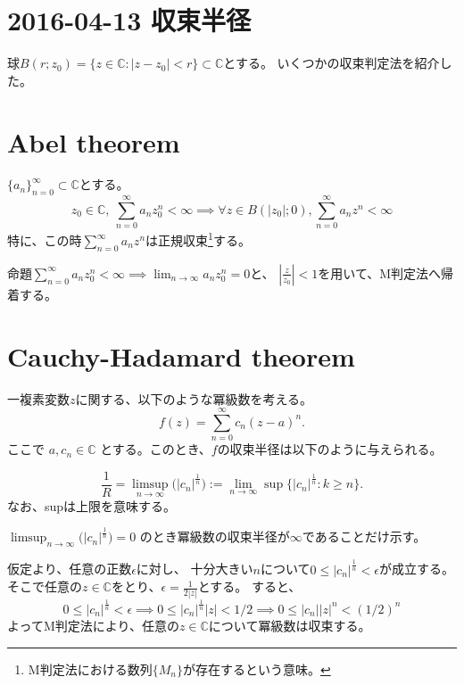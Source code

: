 \documentclass[a4paper]{jarticle}
\begin{document}
\section{2016-04-13 収束半径}
    球$B(r;z_0)=\{ z \in \mathbb{C} : |z-z_0|<r \} \subset \mathbb{C}$とする。
    いくつかの収束判定法を紹介した。

    \section{Abel theorem}
        \begin{Them}
            $\{a_n\}_{n=0}^{\infty} \subset \mathbb{C}$とする。
            \[
                z_0 \in \mathbb{C},~ \sum_{n=0}^{\infty}{a_n z^n_0} < \infty
                \implies
                \forall z \in B(|z_0|; 0), \sum_{n=0}^{\infty}{a_n z^n} < \infty
            \]
            特に、この時$\sum_{n=0}^{\infty}{a_n z^n}$は正規収束\footnote{M判定法における数列$\{M_n\}$が存在するという意味。}する。
        \end{Them}
        \begin{Proof}
            命題$\sum_{n=0}^{\infty}{a_n z^n_0} < \infty \implies \lim_{n \to \infty}{a_n z^n_0}=0$と、
            $|\frac{z}{z_0}|<1$を用いて、M判定法へ帰着する。\QED
        \end{Proof}

    \section{Cauchy-Hadamard theorem}
        \begin{Them}
        一複素変数$z$に関する、以下のような冪級数を考える。
        \[ f(z) = \sum_{n = 0}^{\infty} c_{n} (z-a)^{n}. \]
        ここで $a, c_n \in \mathbb{C}$ とする。このとき、$f$の収束半径は以下のように与えられる。

        \[
            \frac{1}{R}=\limsup_{n \to \infty} \big( | c_{n} |^\frac{1}{n} \big)
            :=\lim_{n\to\infty}\sup\{| c_{n} |^\frac{1}{n} : k\geq n\}.\]
        なお、supは上限を意味する。
        \end{Them}

        \begin{Proof}
            $\limsup_{n \to \infty} \big( | c_{n} |^\frac{1}{n} \big)=0$
            のとき冪級数の収束半径が$\infty$であることだけ示す。

            仮定より、任意の正数$\epsilon$に対し、
            十分大きい$n$について$0 \leq | c_{n} |^\frac{1}{n} < \epsilon$が成立する。
            そこで任意の$z \in \mathbb{C}$をとり、$\epsilon=\frac{1}{2|z|}$とする。
            すると、
            \[
                0 \leq | c_{n} |^\frac{1}{n} < \epsilon
                \implies
                0 \leq | c_{n} |^\frac{1}{n}|z| < 1/2
                \implies
                0 \leq | c_{n} ||z|^{n} < (1/2)^n
            \]
            よってM判定法により、任意の$z \in \mathbb{C}$について冪級数は収束する。
        \end{Proof}
\end{document}
